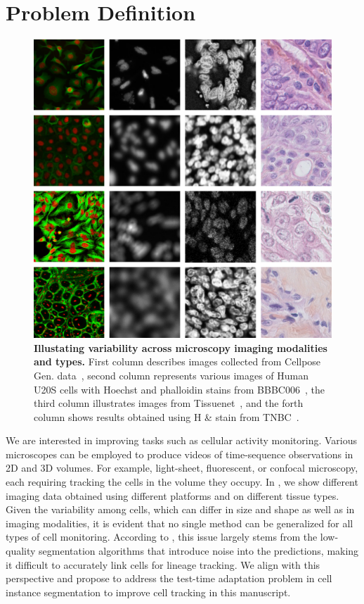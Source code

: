 \section{Problem Definition}
\begin{figure}
    \includegraphics[width=\linewidth]{figs/Modality_Samples_4x4.pdf}
    \caption{\textbf{Illustating variability across microscopy imaging modalities and types.} First column describes images collected from Cellpose Gen. data~\cite{stringer2021cellpose}, second column represents various images of Human U20S cells with Hoechst and phalloidin stains from BBBC006~\cite{ljosa2012annotated}, the third column illustrates images from  Tissuenet~\cite{greenwald2022whole}, and the forth column shows results obtained using H \& stain from TNBC~\cite{naylor2018segmentation}.}
    \label{fig:modality}
\end{figure}


We are interested in improving tasks such as cellular activity monitoring. Various microscopes can be employed to produce videos of time-sequence observations in 2D and 3D volumes. For example, light-sheet, fluorescent, or confocal microscopy, each requiring tracking the cells in the volume they occupy. In , we show different imaging data obtained using different platforms and on different tissue types. Given the variability among cells, which can differ in size and shape as well as in imaging modalities, it is evident that no single method can be generalized for all types of cell monitoring. According to \cite{bragantini2024ultrack}, this issue largely stems from the low-quality segmentation algorithms that introduce noise into the predictions, making it difficult to accurately link cells for lineage tracking. We align with this perspective and propose to address the test-time adaptation problem in cell instance segmentation to improve cell tracking in this manuscript.
 
